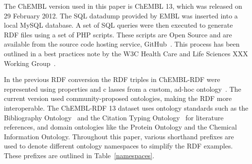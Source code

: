 \documentclass[sw]{iosart2c}
\begin{document}
The ChEMBL version used in this paper is ChEMBL 13, which was released on 29 February 2012.
The SQL datadump provided by EMBL was inserted into a local MySQL database. A set of SQL queries 
were then executed to generate RDF files using a set of PHP scripts. These scripts are Open Source 
and are available from the source code hosting service, GitHub~\citep{ChEMBLRDFGitHub}. This process 
has been outlined in a best practices note by the W3C Health Care and Life Sciences XXX Working Group~\cite{Marshall2012}.

In the previous RDF conversion the RDF triples in ChEMBL-RDF were represented using properties and c
lasses from a custom, ad-hoc ontology~\cite{Willighagen2011}. The current version used community-proposed
ontologies, making the RDF more interoperable. The ChEMBL-RDF 13 dataset uses ontology
standards such as the Bibliography Ontology~\cite{Giasson2011} and the Citation Typing Ontology~\cite{Hastings2011} for literature
references, and domain ontologies like the Protein Ontology\cite{Sidhu2006} and the Chemical Information
Ontology\cite{Hastings2011}. Throughout this paper, various shorthand prefixes are used to denote different ontology 
namespaces to simplify the RDF examples. These prefixes are outlined in Table~\ref{namespaces}.
\end{document}
